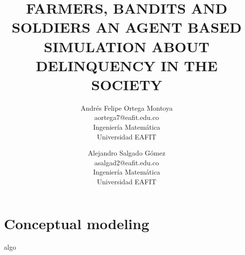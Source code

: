 \documentclass{wscpaperproc}
\begin{document}

\title{FARMERS, BANDITS AND SOLDIERS AN AGENT BASED SIMULATION ABOUT
       DELINQUENCY IN THE SOCIETY}

\author{Andrés Felipe Ortega Montoya\\ [12pt]
aortega7@eafit.edu.co\\
Ingeniería Matemática\\
Universidad EAFIT\\
\and
Alejandro Salgado Gómez\\[12pt]
asalgad2@eafit.edu.co\\
Ingeniería Matemática\\
Universidad EAFIT\\
}

\maketitle

\section{Conceptual modeling}

algo \cite{netlogo}



\end{document}
